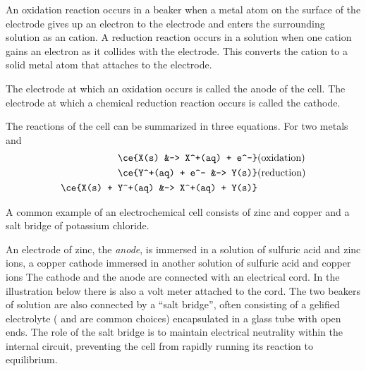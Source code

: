 \documentclass[../mit-general-chemistry.tex]{subfiles}
\begin{document}
An oxidation reaction occurs in a beaker when a metal atom on the
surface of the electrode gives up an electron to the electrode and
enters the surrounding solution as an cation. A reduction reaction
occurs in a solution when one cation gains an electron as it collides
with the electrode. This converts the cation to a solid metal atom
that attaches to the electrode.

The electrode at which an oxidation occurs is called the anode of the
cell. The electrode at which a chemical reduction reaction occurs is
called the cathode.

The reactions of the cell can be summarized in three equations. For
two metals   and 
\begin{align*}
  \ce{X(s) &-> X^+(aq) + e^-}&\text{(oxidation)}\\
  \ce{Y^+(aq) + e^- &-> Y(s)}&\text{(reduction)}\\
  \ce{X(s) + Y^+(aq) &-> X^+(aq) + Y(s)}\\
\end{align*}


A common example of an electrochemical cell consists of zinc and
copper and a salt bridge of potassium chloride.

An electrode of zinc, the {\em anode}, is immersed in a solution of
sulfuric acid and zinc ions, a copper cathode immersed in another
solution of sulfuric acid and copper ions The cathode and the anode
are connected with an electrical cord. In the illustration below there
is also a volt meter attached to the cord. The two beakers of solution
are also connected by a ``salt bridge'', often consisting of a
gelified electrolyte ( and  are common choices)
encapsulated in a glass tube with open ends. The role of the salt
bridge is to maintain electrical neutrality within the internal
circuit, preventing the cell from rapidly running its reaction to
equilibrium.
\end{document}
